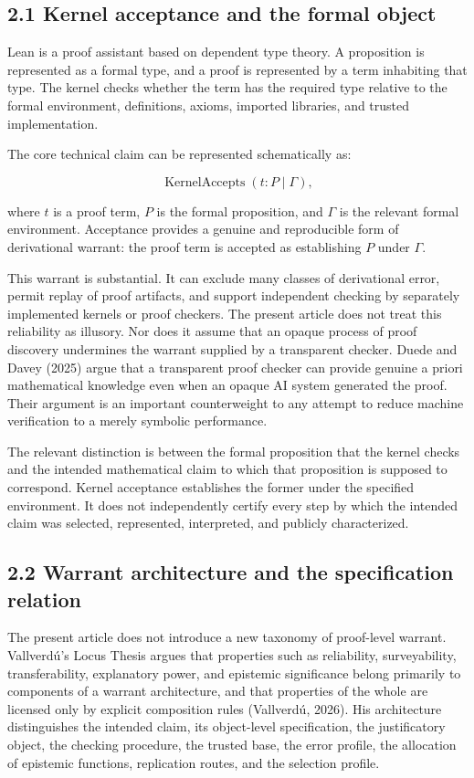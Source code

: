 \documentclass[sn-apa]{sn-jnl}
\begin{document}
\subsection{2.1 Kernel acceptance and the formal object}

Lean is a proof assistant based on dependent type theory. A proposition is represented as a formal type, and a proof is represented by a term inhabiting that type. The kernel checks whether the term has the required type relative to the formal environment, definitions, axioms, imported libraries, and trusted implementation.

The core technical claim can be represented schematically as:

\[
\operatorname{KernelAccepts}(t : P \mid \Gamma),
\]


where \(t\) is a proof term, \(P\) is the formal proposition, and \(\Gamma\) is the relevant formal environment. Acceptance provides a genuine and reproducible form of derivational warrant: the proof term is accepted as establishing \(P\) under \(\Gamma\).

This warrant is substantial. It can exclude many classes of derivational error, permit replay of proof artifacts, and support independent checking by separately implemented kernels or proof checkers. The present article does not treat this reliability as illusory. Nor does it assume that an opaque process of proof discovery undermines the warrant supplied by a transparent checker. Duede and Davey (2025) argue that a transparent proof checker can provide genuine a priori mathematical knowledge even when an opaque AI system generated the proof. Their argument is an important counterweight to any attempt to reduce machine verification to a merely symbolic performance.

The relevant distinction is between the formal proposition that the kernel checks and the intended mathematical claim to which that proposition is supposed to correspond. Kernel acceptance establishes the former under the specified environment. It does not independently certify every step by which the intended claim was selected, represented, interpreted, and publicly characterized.

\subsection{2.2 Warrant architecture and the specification relation}

The present article does not introduce a new taxonomy of proof-level warrant. Vallverdú’s Locus Thesis argues that properties such as reliability, surveyability, transferability, explanatory power, and epistemic significance belong primarily to components of a warrant architecture, and that properties of the whole are licensed only by explicit composition rules (Vallverdú, 2026). His architecture distinguishes the intended claim, its object-level specification, the justificatory object, the checking procedure, the trusted base, the error profile, the allocation of epistemic functions, replication routes, and the selection profile.
\end{document}
